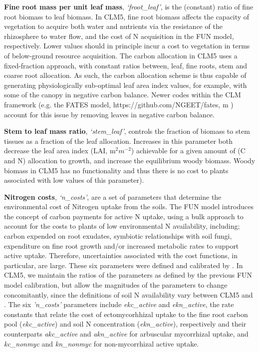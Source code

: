 \usepackage{}\documentclass[draft,linenumbers]{agujournal}
\begin{document}
\textbf{Fine root mass per unit leaf mass}, \emph{`froot\_leaf'}, is the (constant) ratio of fine root biomass to leaf biomass. In CLM5, fine root biomass affects the capacity of vegetation to acquire both water and nutrients via the resistance of the rhizosphere to water flow, and the cost of N acquisition in the FUN model, respectively. Lower values should in principle incur a cost to vegetation in terms of below-ground resource acquisition.  The carbon allocation in CLM5 uses a fixed-fraction approach, with constant ratios between, leaf, fine roots, stem and coarse root allocation. As such, the carbon allocation scheme is thus capable of generating physiologically sub-optimal leaf area index values, for example, with some of the canopy in negative carbon balance. Newer codes within the CLM framework (e.g. the FATES model, https://github.com/NGEET/fates, \cite{fisher2015}m \cite{fisher2018vegetation}) account for this issue by removing leaves in negative carbon balance. 

 \textbf{Stem to leaf mass ratio}, \emph{`stem\_leaf'}, controls the fraction of biomass to stem tissues as a fraction of the leaf allocation. Increases in this parameter both decrease the leaf area index (LAI, m$^{2} m^{-2}$) achievable for a given amount of (C and N) allocation to growth, and increase the equilibrium woody biomass. Woody biomass in CLM5 has no functionality and thus there is no cost to plants associated with low values of this parameter).

\textbf{Nitrogen costs}, \emph{`n\_costs'}, are a set of parameters that determine the environmental cost of Nitrogen uptake from the soils. The FUN model introduces the concept of carbon payments for active N uptake, using a bulk approach to account for the costs to plants of low environmental N availability, including; carbon expended on root exudates, symbiotic relationships with soil fungi, expenditure on fine root growth and/or increased metabolic rates to support active uptake. Therefore, uncertainties associated with the cost functions, in particular, are large. These six parameters were defined and calibrated by \cite{brzostek2014}. In CLM5, we maintain the ratios of the parameters as defined by the previous FUN model calibration, but allow the magnitudes of the parameters to change concomitantly, since the definitions of soil N availability vary between CLM5 and \cite{brzostek2014}. The six \emph{'n\_costs'} parameters include \emph{ekc\_active} and \emph{ekn\_active}, the rate constants that relate the cost of ectomycorhhizal uptake to the fine root carbon pool (\emph{ekc\_active}) and soil N concentration (\emph{ekn\_active}), respectively and their counterparts \emph{akc\_active} and \emph{akn\_active} for arbuscular mycorrhizal uptake, and \emph{kc\_nonmyc} and \emph{kn\_nonmyc} for non-mycorrhizal active uptake. 
\end{document}
